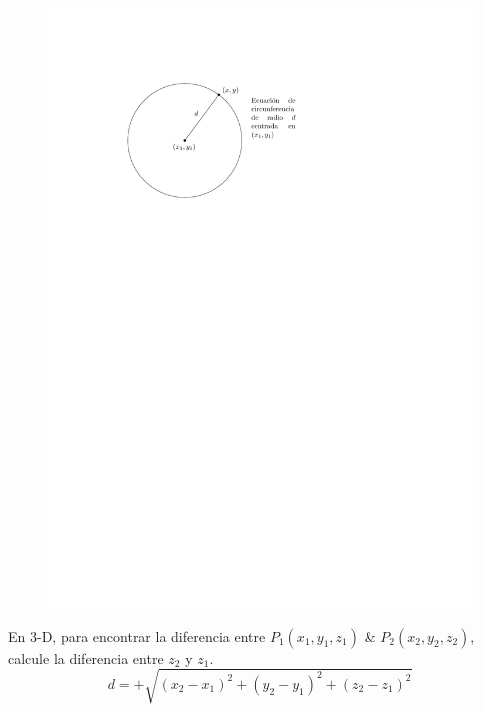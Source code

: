 {\begin{figure}[!htb]
        \includegraphics[scale=0.75]{Clases/figs/2020-01-23-02}
    \end{figure}
    
    En 3-D, para encontrar la diferencia entre $P_1(x_1,y_1,z_1)$ \& $P_2(x_2,y_2,z_2)$, calcule la diferencia entre $z_2$ y $z_1$.
    \[
        d = + \sqrt{(x_2-x_1)^2+(y_2-y_1)^2+(z_2-z_1)^2} 
    \]
}

